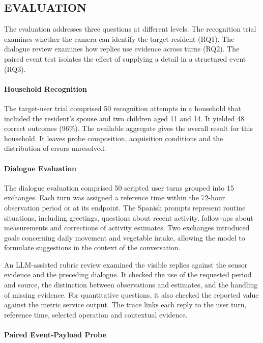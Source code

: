 \documentclass[a4paper,twoside]{article}
\begin{document}
\subsection{\uppercase{Evaluation}}
\label{sec:evaluation}

The evaluation addresses three questions at different levels. The recognition trial examines whether the camera can identify the target resident (RQ1). The dialogue review examines how replies use evidence across turns (RQ2). The paired event test isolates the effect of supplying a detail in a structured event (RQ3).

\paragraph{Household Recognition}

The target-user trial comprised 50 recognition attempts in a household that included the resident's spouse and two children aged 11 and 14. It yielded 48 correct outcomes (96\%). The available aggregate gives the overall result for this household. It leaves probe composition, acquisition conditions and the distribution of errors unresolved.

\paragraph{Dialogue Evaluation}


The dialogue evaluation comprised 50 scripted user turns grouped into 15 exchanges. Each turn was assigned a reference time within the 72-hour observation period or at its endpoint. The Spanish prompts represent routine situations, including greetings, questions about recent activity, follow-ups about measurements and corrections of activity estimates. Two exchanges introduced goals concerning daily movement and vegetable intake, allowing the model to formulate suggestions in the context of the conversation.

An LLM-assisted rubric review examined the visible replies against the sensor evidence and the preceding dialogue. It checked the use of the requested period and source, the distinction between observations and estimates, and the handling of missing evidence. For quantitative questions, it also checked the reported value against the metric service output. The trace links each reply to the user turn, reference time, selected operation and contextual evidence.

\paragraph{Paired Event-Payload Probe}
\end{document}
